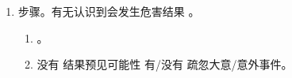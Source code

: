 \begin{enumerate}
        \begin{enumerate}
          \item {}。仅 1 种可能性。。
          \item {}。2 种可能性。发生、不发生都可以。
          \item {}。\yi 预见的可能性大小。1、0.5、0。\er 认识条件（客观）+ 认识能力（主观）。
                \begin{enumerate}
                  \item {}。不想让结果发生，客观上有采取避免措施。。
                  \item {}。
                  \item {}。。
                  \item {}。。
                  \item {}。
                \end{enumerate}
        \end{enumerate}
  \item 步骤。有无认识到会发生危害结果 \xjt。
        \begin{enumerate}
          \item {}。
          \item 没有 \yjt 结果预见可能性 \yjt 有/没有 \yjt 疏忽大意/意外事件。
        \end{enumerate}
        
\end{enumerate}
